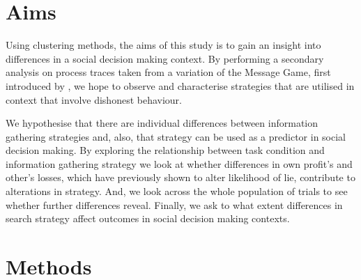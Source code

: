 \documentclass[man, floatsintext]{apa7}
\begin{document}
\section{Aims}

Using clustering methods, the aims of this study is to gain an insight into differences in a social decision making context. By performing a secondary analysis on process traces taken from a variation of the Message Game, first introduced by \cite{shusterContributionSelfOtherregarding2020}, we hope to observe and characterise strategies that are utilised in context that involve dishonest behaviour.

We hypothesise that there are individual differences between information gathering strategies and, also, that strategy can be used as a predictor in social decision making. By exploring the relationship between task condition and information gathering strategy we look at whether differences in own profit's and other's losses, which have previously shown to alter likelihood of lie, contribute to alterations in strategy. And, we look across the whole population of trials to see whether further differences reveal. Finally, we ask to what extent differences in search strategy affect outcomes in social decision making contexts.
 
\section{Methods}


%
%
%
\end{document}
